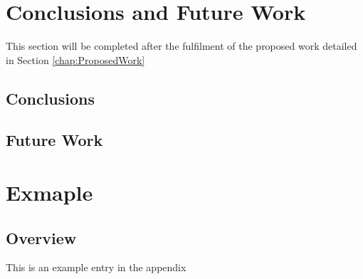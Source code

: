 \documentclass[a4paper,twoside,phd]{BYUPhys}
\begin{document}
\chapter{Conclusions and Future Work}
\label{chap:Conclusions}
This section will be completed after the fulfilment of the proposed work detailed in Section \ref{chap:ProposedWork}


\section{Conclusions}
\label{sec:ConclusionsConclusions}

\section{Future Work}
\label{FutureWork}



\clearemptydoublepage


\appendix
\chapter{Exmaple}
\section{Overview}
This is an example entry in the appendix



%

%

%
\end{document}

